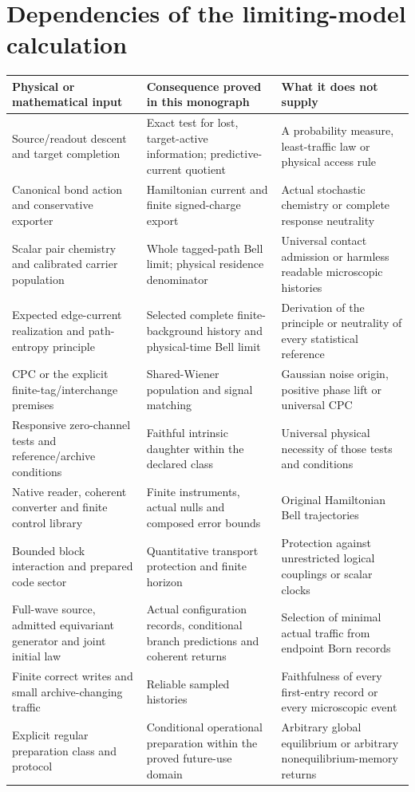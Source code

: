 \documentclass[11pt,oneside,openany]{book}
\theoremstyle{definition}
\theoremstyle{remark}\newtheorem{remark}[theorem]{Remark}
\begin{document}
\section{Dependencies of the limiting-model calculation}
\begin{center}\small
\begin{longtable}{@{}>{\raggedright\arraybackslash}p{}>{\raggedright\arraybackslash}p{}>{\raggedright\arraybackslash}p{}@{}}\toprule
Physical or mathematical input & Consequence proved in this monograph & What it does not supply\\\midrule\endhead
Source/readout descent and target completion & Exact test for lost, target-active information; predictive-current quotient & A probability measure, least-traffic law or physical access rule\\
Canonical bond action and conservative exporter & Hamiltonian current and finite signed-charge export & Actual stochastic chemistry or complete response neutrality\\
Scalar pair chemistry and calibrated carrier population & Whole tagged-path Bell limit; physical residence denominator & Universal contact admission or harmless readable microscopic histories\\
Expected edge-current realization and path-entropy principle & Selected complete finite-background history and physical-time Bell limit & Derivation of the principle or neutrality of every statistical reference\\
CPC or the explicit finite-tag/interchange premises & Shared-Wiener population and signal matching & Gaussian noise origin, positive phase lift or universal CPC\\
Responsive zero-channel tests and reference/archive conditions & Faithful intrinsic daughter within the declared class & Universal physical necessity of those tests and conditions\\
Native reader, coherent converter and finite control library & Finite instruments, actual nulls and composed error bounds & Original Hamiltonian Bell trajectories\\
Bounded block interaction and prepared code sector & Quantitative transport protection and finite horizon & Protection against unrestricted logical couplings or scalar clocks\\
Full-wave source, admitted equivariant generator and joint initial law & Actual configuration records, conditional branch predictions and coherent returns & Selection of minimal actual traffic from endpoint Born records\\
Finite correct writes and small archive-changing traffic & Reliable sampled histories & Faithfulness of every first-entry record or every microscopic event\\
Explicit regular preparation class and protocol & Conditional operational preparation within the proved future-use domain & Arbitrary global equilibrium or arbitrary nonequilibrium-memory returns\\\bottomrule
\end{longtable}
\end{center}
\end{document}
